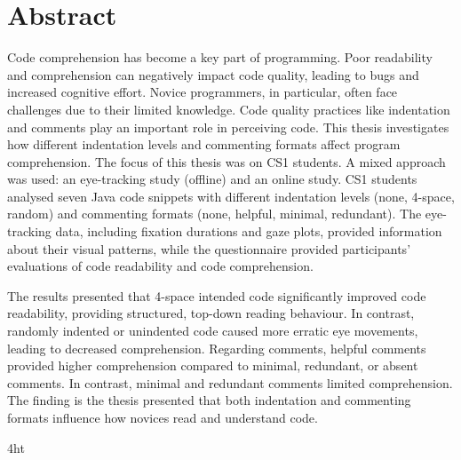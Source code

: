 \documentclass[14pt, a4paper, twoside, bibliography=totoc, headsepline, cleardoublepage=empty, parskip=half, draft=false]{scrbook}
\begin{document}
\cleardoublepage

\section*{Abstract}

Code comprehension has become a key part of programming. Poor readability and comprehension can negatively impact code quality, leading to bugs and increased cognitive effort. Novice programmers, in particular, often face challenges due to their limited knowledge. Code quality practices like indentation and comments play an important role in perceiving code. This thesis investigates how different indentation levels and commenting formats affect program comprehension. The focus of this thesis was on CS1 students.  A mixed approach was used: an eye-tracking study (offline) and an online study. CS1 students analysed seven Java code snippets with different indentation levels (none, 4-space, random) and commenting formats (none, helpful, minimal, redundant). The eye-tracking data, including fixation durations and gaze plots, provided information about their visual patterns, while the questionnaire provided participants' evaluations of code readability and code comprehension. 

The results presented that 4-space intended code significantly improved code readability, providing structured, top-down reading behaviour. In contrast, randomly indented or unindented code caused more erratic eye movements, leading to decreased comprehension. Regarding comments, helpful comments provided higher comprehension compared to minimal, redundant, or absent comments.  In contrast, minimal and redundant comments limited comprehension. The finding is the thesis presented that both indentation and commenting formats influence how novices read and understand code.
\cleardoublepage



\iftex4ht
\else
\fi

%
%

%
%
%
\tableofcontents
\end{document}
